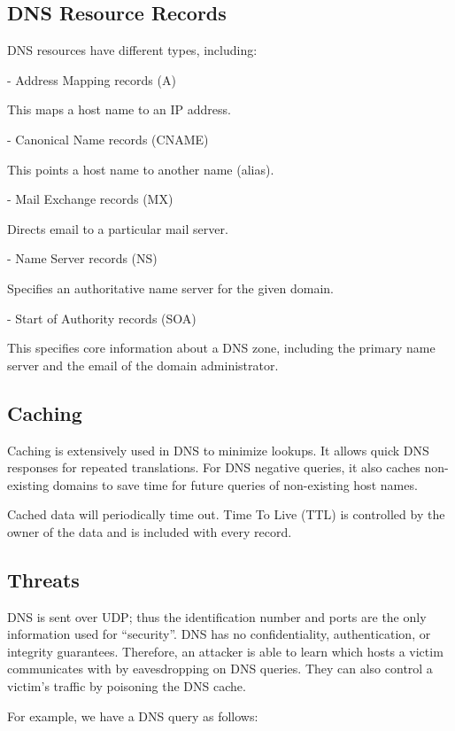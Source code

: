 \subsection{DNS Resource Records}
DNS resources have different types, including:

- Address Mapping records (A)  

This maps a host name to an IP address.  

- Canonical Name records (CNAME)  

This points a host name to another name (alias).  

- Mail Exchange records (MX)  

Directs email to a particular mail server.  

- Name Server records (NS)  

Specifies an authoritative name server for the given domain.  

- Start of Authority records (SOA)  

This specifies core information about a DNS zone, including the primary name server and the email of the domain administrator.  

\subsection{Caching}
Caching is extensively used in DNS to minimize lookups. It allows quick DNS responses for repeated translations. For DNS negative queries, it also caches non-existing domains to save time for future queries of non-existing host names.  

Cached data will periodically time out. Time To Live (TTL) is controlled by the owner of the data and is included with every record. 

\subsection{Threats}
DNS is sent over UDP; thus the identification number and ports are the only information used for ``security''. DNS has no confidentiality, authentication, or integrity guarantees. Therefore, an attacker is able to learn which hosts a victim communicates with by eavesdropping on DNS queries. They can also control a victim's traffic by poisoning the DNS cache. 

For example, we have a DNS query as follows:


